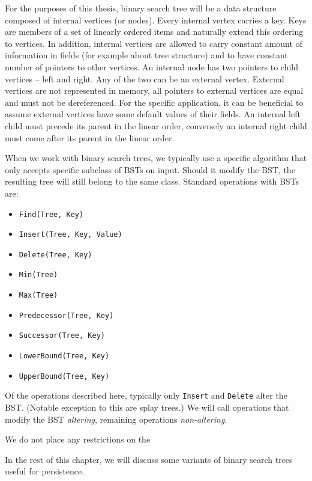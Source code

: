 For the purposes of this thesis, binary search tree will be a data structure composed of internal vertices (or nodes). Every internal vertex carries a key. Keys are members of a set of linearly ordered items and naturally extend this ordering to vertices. In addition, internal vertices are allowed to carry constant amount of information in fields (for example about tree structure) and to have constant number of pointers to other vertices. An internal node has two pointers to child vertices -- left and right. Any of the two can be an external vertex. External vertices are not represented in memory, all pointers to external vertices are equal and must not be dereferenced. For the specific application, it can be beneficial to assume external vertices have some default values of their fields. An internal left child must precede its parent in the linear order, conversely an internal right child must come after its parent in the linear order.

When we work with binary search trees, we typically use a specific algorithm that only accepts specific subclass of BSTs on input. Should it modify the BST, the resulting tree will still belong to the same class. Standard operations with BSTs are:

\begin{itemize}
	\item \texttt{Find(Tree, Key)}
	\item \texttt{Insert(Tree, Key, Value)}
	\item \texttt{Delete(Tree, Key)}
	\item \texttt{Min(Tree)}
	\item \texttt{Max(Tree)}
	\item \texttt{Predecessor(Tree, Key)}
	\item \texttt{Successor(Tree, Key)}
	\item \texttt{LowerBound(Tree, Key)}
	\item \texttt{UpperBound(Tree, Key)}
\end{itemize}

Of the operations described here, typically only \texttt{Insert} and \texttt{Delete} alter the BST. (Notable exception to this are splay trees.) We will call operations that modify the BST {\em altering}, remaining operations {\em non-altering}.

We do not place any restrictions on the 

In the rest of this chapter, we will discuss some variants of binary search trees useful for persistence.